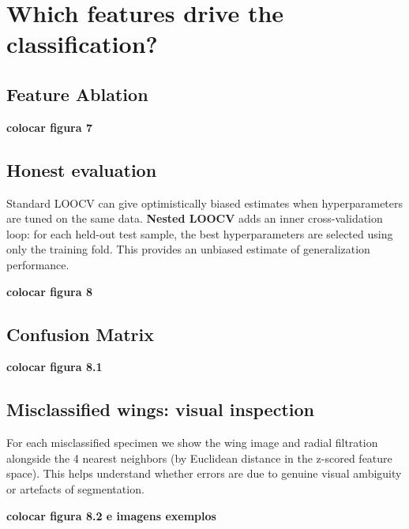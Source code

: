 \documentclass{birkjour}
\theoremstyle{definition}
\theoremstyle{remark}
\numberwithin{equation}{section}
\begin{document}
\section{Which features drive the classification?}

\subsection{Feature Ablation}

{\bf colocar figura 7}


\subsection{Honest evaluation}\quad


Standard LOOCV can give optimistically biased estimates when hyperparameters are tuned on the same data. \textbf{Nested LOOCV} adds an inner cross-validation loop: for each held-out test sample, the best hyperparameters are selected using only the training fold. This provides an unbiased estimate of generalization performance.

{\bf colocar figura 8}

\subsection{Confusion Matrix}\quad 

{\bf colocar figura 8.1}

\subsection{Misclassified wings: visual inspection}\quad

For each misclassified specimen we show the wing image and radial filtration alongside the 4 nearest neighbors (by Euclidean distance in the z-scored feature space). This helps understand whether errors are due to genuine visual ambiguity or artefacts of segmentation.

{\bf colocar figura 8.2 e imagens exemplos}
\end{document}
